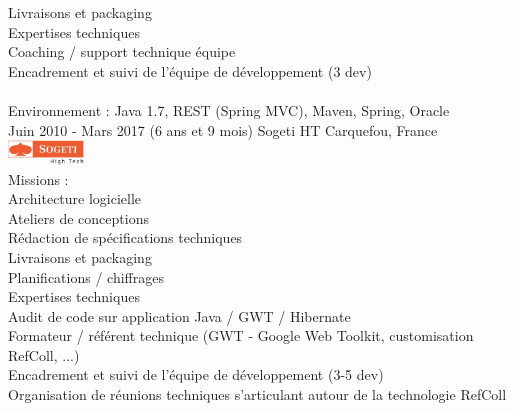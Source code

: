 \documentclass[]{cv-style}          %
\begin{document}
\begin{entrylist}
{\hspace{0.6cm}Livraisons et packaging\\
\hspace{0.6cm}Expertises techniques\\
\hspace{0.6cm}Coaching / support technique équipe\\
\hspace{0.6cm}Encadrement et suivi de l'équipe de développement (3 dev)\\
\\
Environnement : Java 1.7, REST (Spring MVC), Maven, Spring, Oracle\\
}
\entry
  {Juin 2010 - Mars 2017 (6 ans et 9 mois)}
  {Sogeti HT}
  {Carquefou, France}
  {\hfill\includegraphics[width=2cm]{sogeti.jpg}\\
Missions :\\
\hspace{0.6cm}Architecture logicielle\\
\hspace{0.6cm}Ateliers de conceptions\\
\hspace{0.6cm}Rédaction de spécifications techniques\\
\hspace{0.6cm}Livraisons et packaging\\
\hspace{0.6cm}Planifications / chiffrages\\
\hspace{0.6cm}Expertises techniques\\
\hspace{0.6cm}Audit de code sur application Java / GWT / Hibernate\\
\hspace{0.6cm}Formateur / référent technique (GWT - Google Web Toolkit, customisation RefColl, ...)\\
\hspace{0.6cm}Encadrement et suivi de l'équipe de développement (3-5 dev)\\
\hspace{0.6cm}Organisation de réunions techniques s’articulant autour de la technologie RefColl\\
 \\
}
\end{entrylist}
\end{document}
